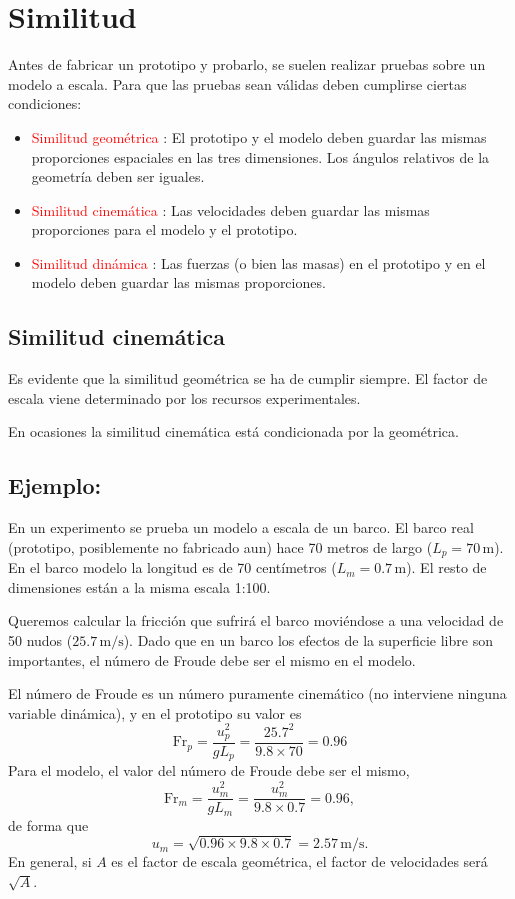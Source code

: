 \section{Similitud}
	
	Antes de fabricar un prototipo y probarlo, se suelen realizar pruebas
	sobre un modelo a escala. Para que las pruebas sean válidas deben
	cumplirse ciertas condiciones: 
	\begin{itemize}
		\item \textcolor{red}{Similitud geométrica} : El prototipo y el modelo deben
		guardar las mismas proporciones espaciales en las tres dimensiones.
		Los ángulos relativos de la geometría deben ser iguales. 
		\item \textcolor{red}{Similitud cinemática} : Las velocidades deben guardar
		las mismas proporciones para el modelo y el prototipo. 
		\item \textcolor{red}{Similitud dinámica} : Las fuerzas (o bien las masas)
		en el prototipo y en el modelo deben guardar las mismas proporciones. 
	\end{itemize}

\subsection{Similitud cinemática}
	
	Es evidente que la similitud geométrica se ha de cumplir siempre.
	El factor de escala viene determinado por los recursos experimentales.
	
	
	En ocasiones la similitud cinemática está condicionada por la geométrica. 
	\subsection*{Ejemplo:}
		En un experimento se prueba un modelo a escala de un barco. El barco
		real (prototipo, posiblemente no fabricado aun) hace 70 metros de
		largo ($L_{p}=70\,\text{m}$). En el barco modelo la longitud es de
		70 centímetros ($L_{m}=0.7\,\text{m}$). El resto de dimensiones están
		a la misma escala 1:100.
		
		Queremos calcular la fricción que sufrirá el barco moviéndose a una
		velocidad de 50 nudos ($25.7\,\text{m/s}$). Dado que en un barco
		los efectos de la superficie libre son importantes, el número de Froude
		debe ser el mismo en el modelo. 

		El número de Froude es un número puramente cinemático (no interviene
		ninguna variable dinámica), y en el prototipo su valor es 
		\[
		\text{Fr}_{p}=\frac{u_{p}^{2}}{gL_{p}}=\frac{25.7^{2}}{9.8\times70}=0.96
		\]
		Para el modelo, el valor del número de Froude debe ser el mismo, 
		\[
		\text{Fr}_{m}=\frac{u_{m}^{2}}{gL_{m}}=\frac{u_{m}^{2}}{9.8\times0.7}=0.96,
		\]
		de forma que 
		\[
		u_{m}=\sqrt{0.96\times9.8\times0.7}=2.57\,\text{m/s}.
		\]
		En general, si $A$ es el factor de escala geométrica, el factor de
		velocidades será $\sqrt{A}$.


